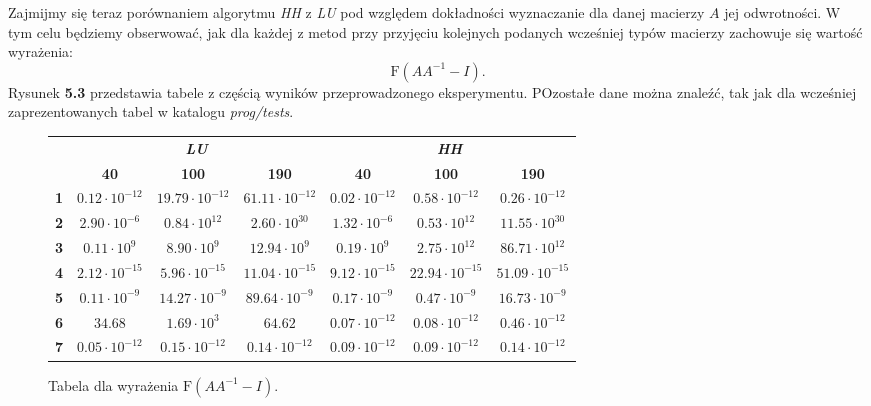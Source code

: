 Zajmijmy się teraz porównaniem algorytmu \textit{HH} z \textit{LU} pod względem dokładności wyznaczanie dla
danej macierzy $A$ jej odwrotności. W tym celu będziemy obserwować, jak dla każdej z metod przy przyjęciu kolejnych
podanych wcześniej typów macierzy zachowuje się wartość wyrażenia:
$$\mathrm{F}(AA^{-1} - I).$$
Rysunek \textbf{5.3} przedstawia tabele z częścią wyników przeprowadzonego eksperymentu. POzostałe dane można znaleźć, tak jak dla wcześniej
zaprezentowanych tabel w katalogu \textit{prog/tests}.
\begin{figure}[h!tb]
\begin{center}
\begin{tabular}{|l||c|c|c||c|c|c|}
\hline
\multirow{2}{*}{} & \multicolumn{3}{|c||}{\textbf{\textit{LU}}} & \multicolumn{3}{|c|}{\textbf{\textit{HH}}}\\
\cline{2-7}
& \textbf{40} & \textbf{100} & \textbf{190} & \textbf{40} & \textbf{100} & \textbf{190} \\
\hline
\hline
\textbf{1} & $0.12 \cdot 10^{-12}$ & $19.79 \cdot 10^{-12}$ & $61.11 \cdot 10^{-12}$ & $0.02 \cdot 10^{-12}$ & $0.58 \cdot 10^{-12}$ & $0.26 \cdot 10^{-12}$ \\
\hline
\textbf{2} & $2.90 \cdot 10^{-6}$ & $0.84 \cdot 10^{12}$ & $2.60 \cdot 10^{30}$ & $1.32 \cdot 10^{-6}$ & $0.53 \cdot 10^{12} $ & $11.55 \cdot 10^{30}$ \\
\hline
\textbf{3} & $0.11 \cdot 10^{9}$ & $8.90\cdot 10^{9}$ & $12.94\cdot 10^{9}$ & $0.19\cdot 10^{9}$ & $2.75\cdot 10^{12}$ & $86.71\cdot 10^{12}$ \\
\hline
\textbf{4} & $2.12 \cdot 10^{-15}$ & $5.96 \cdot 10^{-15}$ & $11.04 \cdot 10^{-15}$ & $9.12 \cdot 10^{-15}$ & $22.94 \cdot 10^{-15}$ & $51.09 \cdot 10^{-15}$ \\
\hline
\textbf{5} & $0.11 \cdot 10^{-9}$ & $14.27 \cdot 10^{-9}$ & $89.64 \cdot 10^{-9}$ & $0.17 \cdot 10^{-9}$ & $0.47 \cdot 10^{-9}$ & $16.73 \cdot 10^{-9}$ \\
\hline
\textbf{6} & $34.68$ & $1.69 \cdot 10^{3}$ & $64.62$ & $0.07 \cdot 10^{-12}$ & $0.08 \cdot 10^{-12}$ & $0.46 \cdot 10^{-12}$ \\
\hline
\textbf{7} & $0.05 \cdot 10^{-12}$ & $0.15 \cdot 10^{-12}$ & $0.14 \cdot 10^{-12}$ & $0.09 \cdot 10^{-12}$ & $0.09 \cdot 10^{-12}$ & $0.14 \cdot 10^{-12}$ \\
\hline
\end{tabular}
\caption{Tabela dla wyrażenia $\mathrm{F}(AA^{-1}-I)$.} 
\end{center}
\end{figure}


